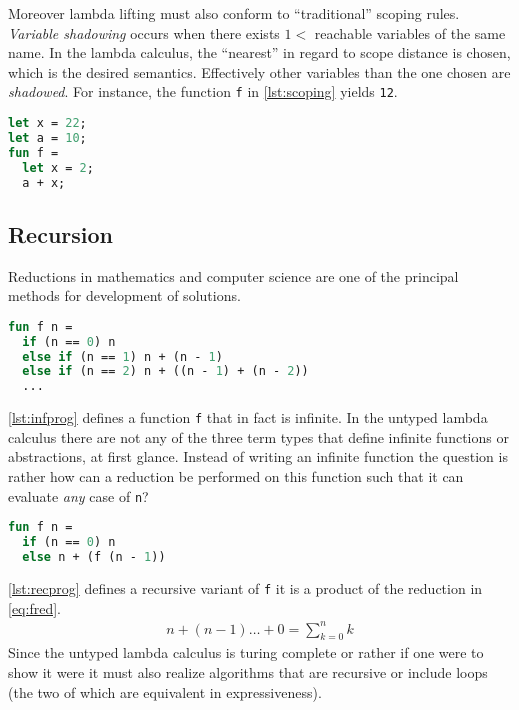 Moreover lambda lifting must also conform to ``traditional'' scoping rules.
\textit{Variable shadowing} occurs when there exists $1 < $ reachable variables of the same name.
In the lambda calculus, the ``nearest'' in regard to scope distance is chosen, which is the desired semantics.
Effectively other variables than the one chosen are \textit{shadowed}.
For instance, the function \texttt{f} in \autoref{lst:scoping} yields \texttt{12}.
\begin{lstlisting}[language=ML,caption={Scoping rules in programming languages},label={lst:scoping}]
let x = 22;
let a = 10;
fun f = 
  let x = 2;
  a + x;
\end{lstlisting}

\subsection{Recursion}
\label{sec:lamrec}
\noindent Reductions in mathematics and computer science are one of the principal methods for development of solutions.
\begin{lstlisting}[language=ML,caption={Infinite program},label={lst:infprog}]
fun f n = 
  if (n == 0) n
  else if (n == 1) n + (n - 1)
  else if (n == 2) n + ((n - 1) + (n - 2))
  ...
\end{lstlisting}
\autoref{lst:infprog} defines a function \texttt{f} that in fact is infinite.
In the untyped lambda calculus there are not any of the three term types that define infinite functions or abstractions, at first glance.
Instead of writing an infinite function the question is rather how can a reduction be performed on this function such that it can evaluate \textit{any} case of \texttt{n}?
\begin{lstlisting}[language=ML,caption={Recursive program},label={lst:recprog}]
fun f n = 
  if (n == 0) n
  else n + (f (n - 1))
\end{lstlisting}
\autoref{lst:recprog} defines a recursive variant of \texttt{f} it is a product of the reduction in \autoref{eq:fred}.
\begin{align}
    n + (n - 1) \dots + 0 = \sum_{k = 0}^n k
    \label{eq:fred}
\end{align}
Since the untyped lambda calculus is turing complete or rather if one were to show it were it must also realize algorithms that are recursive or include loops (the two of which are equivalent in expressiveness).
